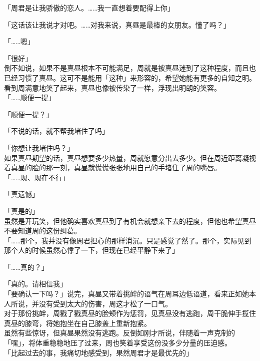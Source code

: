 「周君是让我骄傲的恋人。……我一直想着要配得上你」

「这话该让我说才对吧。……对我来说，真昼是最棒的女朋友。懂了吗？」

「……嗯」

「很好」\\

倒不如说，如果不是真昼根本不可能满足，周就是被真昼迷到了这种程度，而且也已经习惯了真昼。这可不是能用「这种」来形容的，希望她能有更多的自知之明。\\

看到周满意地笑了起来，真昼也像被传染了一样，浮现出明朗的笑容。\\

「……顺便一提」

「顺便一提？」

「不说的话，就不帮我堵住了吗」

「你想让我堵住吗？」\\

如果真昼期望的话，真昼想要多少热量，周就愿意分出去多少。但在周近距离凝视着真昼的脸的那一刻，真昼就慌慌张张地用自己的手堵住了周的嘴唇。\\

「……现、现在不行」

「真遗憾」

「真是的」\\

虽然是开玩笑，但他确实喜欢真昼到了有机会就想亲下去的程度，但他也希望真昼不要知道周的这份纠葛。\\

「……那个，我并没有像周君担心的那样消沉。只是感觉了然了。那个，实际见到那个人的时候虽然心悸了一下，但现在已经平静下来了」

「……真的？」

「真的。请相信我」\\

「要确认一下吗？」说完，真昼又带着挑衅的语气在周耳边低语道，看来正如她本人所说，并没有受到太大的伤害，周这才松了一口气。\\

对于那份挑衅，周戳了戳真昼的脸颊作为惩罚，见真昼没有逃跑，周干脆伸手揽住真昼的膝弯，将她抱坐在自己膝盖上重新抱紧。\\

虽然有些惊讶，但真昼果然没有逃跑。反倒如刚才所说，伴随着一声克制的「嘿」，将体重稳稳地压了过来，周也笑着享受这份没多少分量的压迫感。\\

「比起过去的事，我痛切地感受到，果然周君才是最优先的」

